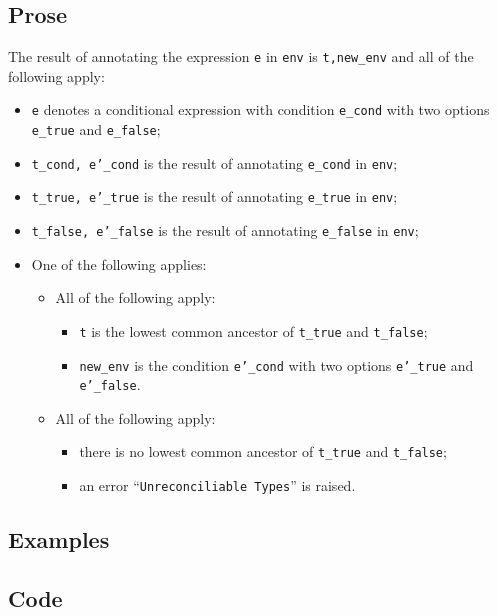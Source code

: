 \documentclass{book}
\begin{document}
  \subsection{Prose}
  The result of annotating the expression \texttt{e} in \texttt{env} is
\texttt{t,new\_env} and all of the following apply:
  \begin{itemize}
  \item \texttt{e} denotes a conditional expression with condition \texttt{e\_cond} with two options \texttt{e\_true} and \texttt{e\_false};
  \item \texttt{t\_cond, e'\_cond} is the result of annotating \texttt{e\_cond} in \texttt{env};
  \item \texttt{t\_true, e'\_true} is the result of annotating \texttt{e\_true} in \texttt{env};
  \item \texttt{t\_false, e'\_false} is the result of annotating \texttt{e\_false} in \texttt{env};
  \item One of the following applies:
    \begin{itemize}
    \item All of the following apply:
      \begin{itemize}
      \item \texttt{t} is the lowest common ancestor of \texttt{t\_true} and \texttt{t\_false};
      \item \texttt{new\_env} is the condition \texttt{e'\_cond} with two options \texttt{e'\_true} and \texttt{e'\_false}.
      \end{itemize}
    \item All of the following apply:
      \begin{itemize}
      \item there is no lowest common ancestor of \texttt{t\_true} and \texttt{t\_false};
      \item an error ``\texttt{Unreconciliable Types}'' is raised.
      \end{itemize}
    \end{itemize}
  \end{itemize}

  \subsection{Examples}

  \subsection{Code}
\end{document}
